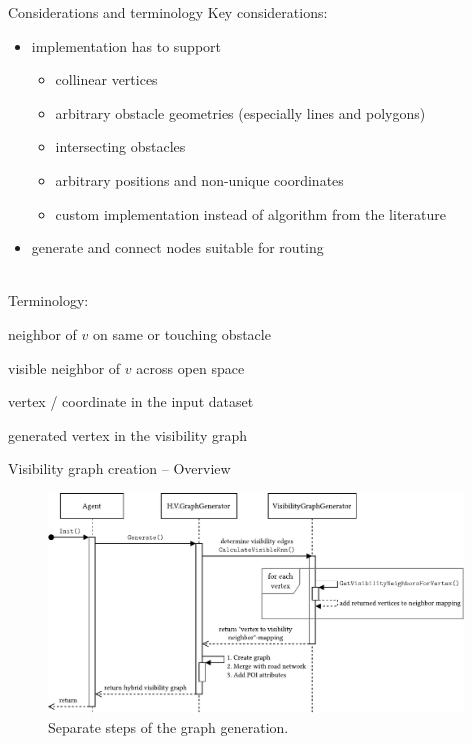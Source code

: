 \documentclass[xcolor={x11names}]{beamer}
\renewcommand{\n}{\hfill\\[0.5ex]}
\newcommand{\nn}{\hfill\\[2ex]}
\newenvironment{figcenter}
{%
	\parskip=0pt%
	\par%
	\nopagebreak%
	\centering%
}%
{%
	\par%
	\noindent%
	\ignorespacesafterend%
}
\begin{document}
		\begin{frame}{Considerations and terminology}
			Key considerations:\n
			\begin{itemize}
				\item implementation has to support
				\begin{itemize}
					\item collinear vertices
					\item arbitrary obstacle geometries (especially lines and polygons)
					\item intersecting obstacles
					\item arbitrary positions and non-unique coordinates
					\item[\textrightarrow] custom implementation instead of algorithm from the literature
				\end{itemize}
				\item generate and connect nodes suitable for routing
			\end{itemize}
			\nn
			\pause
			Terminology:\n
			\begin{description}
				\item[obstacle neighbor] neighbor of $v$ on same or touching obstacle
				\item[visibility neighbor] visible neighbor of $v$ across open space
				\item[input vertex] vertex / coordinate in the input dataset
				\item[output vertex] generated vertex in the visibility graph
			\end{description}
		\end{frame}
		
		\begin{frame}{Visibility graph creation -- Overview}
			\begin{figure}[t]
				\begin{figcenter}
					\includegraphics[width=0.98\textwidth]{images/components-sequence-generation-short.pdf}
				\end{figcenter}
				\caption{Separate steps of the graph generation.}
			\end{figure}
		\end{frame}
		
\end{document}
